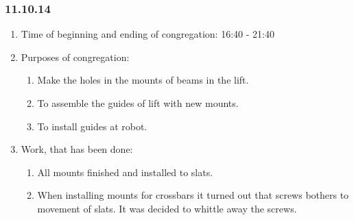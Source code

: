 
\subsubsection{11.10.14}

\begin{enumerate}
	\item Time of beginning and ending of congregation:
	16:40 - 21:40
	\item Purposes of congregation:
	\begin{enumerate}
	  \item Make the holes in the mounts of beams in the lift.
	  
	  \item To assemble the guides of lift with new mounts.
	  
	  \item To install guides at robot.
	  
    \end{enumerate}
	\item Work, that has been done:
	\begin{enumerate}
	  \item All mounts finished and installed to slats.
      
      \item When installing mounts for crossbars it turned out that screws bothers to movement of slats. It was decided to whittle away the screws.
      

\end{enumerate}
\end{enumerate}
